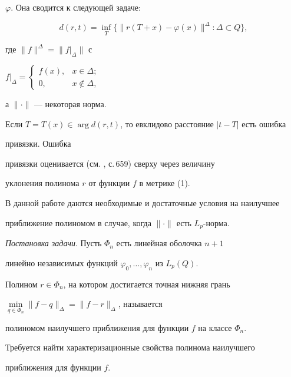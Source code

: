 $\varphi$. Она сводится к следующей задаче: 


$$ 


d(r,t)=\inf_T\{\|r(T+x)-\varphi(x)\|^\Delta:\Delta\subset Q\}, 


$$ 


где $\|f\|^\Delta=\|f|_\Delta\|$ с 


$f|_\Delta= 


\begin{cases} 


f(x), & x\in\Delta; \\ 


0, & x\notin \Delta, 


\end{cases}$


а $\|\cdot\|$ --- некоторая норма. 


 


Если $T=T(x)\in\arg d(r,t)$, то евклидово расстояние $|t-T|$ есть ошибка 


привязки. Ошибка 


привязки оценивается (см. \cite{1}, с.\,659) сверху через величину 


уклонения полинома $r$ от функции $f$ в метрике (1). 


 


В данной работе даются необходимые и достаточные условия на наилучшее 


приближение полиномом в случае, когда $\|\cdot\|$ есть $L_p$-норма. 


\medskip 


 


{\it Постановка задачи}. Пусть $\Phi_n$ есть линейная оболочка $n+1$ 


линейно независимых функций $\varphi_0,\dotsc,\varphi_n$ из $L_p(Q)$. 


Полином $r\in\Phi_n$, на котором достигается точная нижняя грань \linebreak


$\min\limits_{q\in\Phi_n}\|f-q\|_\Delta=\|f-r\|_\Delta$, называется 


полиномом наилучшего приближения для функции $f$ на классе $\Phi_n$. 


Требуется найти характеризационные свойства полинома наилучшего 


приближения для функции $f$. 


 


